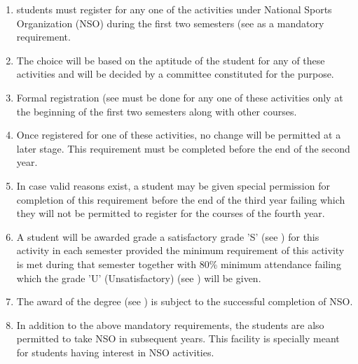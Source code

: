 \begin{enumerate}[leftmargin=15mm]
    \item \Glspl{student} must register for any one of the activities under National Sports Organization (NSO) during the first two semesters (see  as a mandatory requirement.
    \item The choice will be based on the aptitude of the \gls{student} for any of these activities and will be decided by a committee constituted for the purpose. 
    \item Formal registration (see  must be done for any one of these activities only at the beginning of the first two semesters along with other courses. 
    \item Once registered for one of these activities, no change will be permitted at a later stage. This requirement must be completed before the end of the second year. 
    \item In case valid reasons exist, a \gls{student} may be given special permission for completion of this requirement before the end of the third year failing which they will not be permitted to register for the courses of the fourth year. 
    \item A \gls{student} will be awarded grade a satisfactory grade 'S' (see ) for this activity in each semester provided the minimum requirement of this activity is met during that semester together with 80\% minimum attendance failing which the grade 'U' (Unsatisfactory) (see ) will be given. 
    \item The award of the degree (see ) is subject to the successful completion of NSO. 
    \item In addition to the above mandatory requirements, the \glspl{student} are also permitted to take NSO in subsequent years. This facility is specially meant for \glspl{student} having interest in NSO activities.
\end{enumerate}